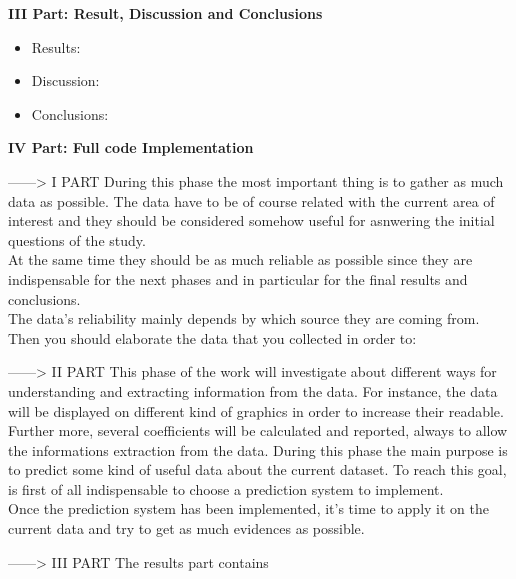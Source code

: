 \textbf{III Part: Result, Discussion and Conclusions }
\vspace{-5mm}
\begin{itemize}
 \setlength{\itemsep}{-5pt}
 \item Results:
 \item Discussion:
 \item Conclusions:
\end{itemize}


\textbf{IV Part: Full code Implementation }

\newpage

------> I PART
During this phase the most important thing is to gather as much data as possible. The data have to be of course related with the current area of interest and they should be considered somehow useful for asnwering the initial questions of the study.\\
At the same time they should be as much reliable as possible since they are indispensable for the next phases and in particular for the final results and conclusions.\\
The data’s reliability mainly depends by which source they are coming from.\\
Then you should elaborate the data that you collected in order to:

------> II PART
This phase of the work will investigate about different ways for understanding and extracting information from the data.
For instance, the data will be displayed on different kind of graphics in order to increase their readable. Further more, several coefficients will be calculated and reported, always to allow the informations extraction from the data.
During this phase the main purpose is to predict some kind of useful data about the current dataset. To reach this goal, is first of all indispensable to choose a prediction system to implement. \\
Once the prediction system has been implemented, it's time to apply it on the current data and try to get as much evidences as possible.

------> III PART
The results part contains

